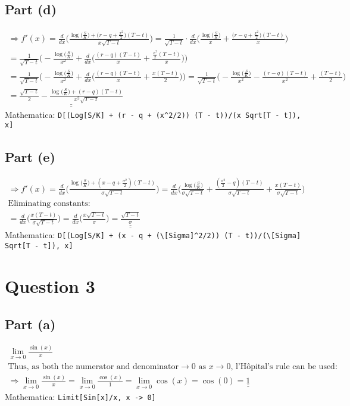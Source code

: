\documentclass[letterpaper,10pt]{article}
\newcommand{\doubleu}[1]{\underline{\underline{#1}}}
\newcommand{\ddx}[1]{\frac{d}{dx} \bigg( #1 \bigg)}
\newcommand{\mathematica}[1]{Mathematica: \texttt{#1}}
\begin{document}
		\subsection{Part (d)}
			\begin{gather*}
				\Rightarrow f'(x) = \ddx{\frac{\log \big(\frac{S}{K}\big) + \Big(r-q+\frac{x^2}{2}\Big) (T-t)}{x\sqrt{T-t}}}
				= \frac{1}{\sqrt{T-t}} \cdot \ddx{\frac{\log \big(\frac{S}{K}\big)}{x} + \frac{\Big(r-q+\frac{x^2}{2}\Big) (T-t)}{x}} \\
				= \frac{1}{\sqrt{T-t}} \Bigg( -\frac{\log \big(\frac{S}{K}\big)}{x^2} + \ddx{\frac{(r-q)(T-t)}{x} + \frac{\frac{x^2}{2}(T-t)}{x}} \Bigg) \\
				= \frac{1}{\sqrt{T-t}} \Bigg( -\frac{\log \big(\frac{S}{K}\big)}{x^2} + \ddx{\frac{(r-q)(T-t)}{x} + \frac{x(T-t)}{2}} \Bigg)
				= \frac{1}{\sqrt{T-t}} \Bigg( -\frac{\log \big(\frac{S}{K}\big)}{x^2} - \frac{(r-q)(T-t)}{x^2} + \frac{(T-t)}{2} \Bigg) \\
				= \doubleu{\frac{\sqrt{T-t}}{2} - \frac{\log \big(\frac{S}{K}\big) + (r-q)(T-t)}{x^2\sqrt{T-t}}}
			\end{gather*}
			\mathematica{D[(Log[S/K] + (r - q + (x\^{}2/2)) (T - t))/(x Sqrt[T - t]), x]}

		\subsection{Part (e)}
			\begin{gather*}
				\Rightarrow f'(x) = \ddx{\frac{\log \big(\frac{S}{K}\big) + (x-q+\frac{\sigma^2}{2})(T-t)}{\sigma\sqrt{T-t}}}
				= \ddx{\frac{\log \big(\frac{S}{K}\big)}{\sigma\sqrt{T-t}} + \frac{(\frac{\sigma^2}{2}-q)(T-t)}{\sigma\sqrt{T-t}} + \frac{x(T-t)}{\sigma\sqrt{T-t}}} \\
				\text{Eliminating constants:} \\
				= \ddx{\frac{x(T-t)}{\sigma\sqrt{T-t}}}
				= \ddx{\frac{x\sqrt{T-t}}{\sigma}}
				= \doubleu{\frac{\sqrt{T-t}}{\sigma}}
			\end{gather*}
			\mathematica{D[(Log[S/K] + (x - q + (\textbackslash[Sigma]\^{}2/2)) (T - t))/(\textbackslash[Sigma] Sqrt[T - t]), x]}


	\section{Question 3}
		\subsection{Part (a)}
			\begin{gather*}
				\lim_{x \rightarrow 0} \frac{\sin (x)}{x} \\
				\text{Thus, as both the numerator and denominator} \rightarrow 0 \text{ as } x \rightarrow 0 \text{, l'H\^opital's rule can be used:} \\
				\Rightarrow \lim_{x \rightarrow 0} \frac{\sin (x)}{x} = \lim_{x \rightarrow 0} \frac{\cos (x)}{1} = \lim_{x \rightarrow 0} \cos (x) = \cos (0) = \doubleu{1}
			\end{gather*}
			\mathematica{Limit[Sin[x]/x, x -> 0]}
\end{document}
